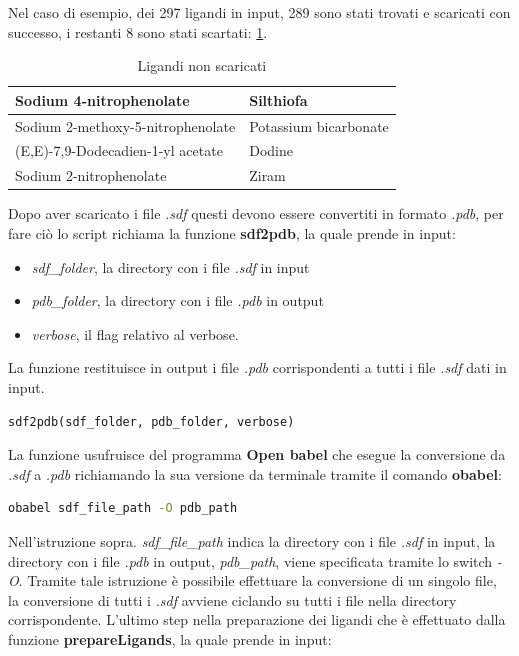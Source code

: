 Nel caso di esempio, dei 297 ligandi in input, 289 sono stati trovati e scaricati con successo, i restanti 8 sono stati scartati: \ref{tab:Ligandi scartati}.

\begin{table}[H]
    \centering
    \begin{tabular}{|l|l|}
    \hline
    Sodium 4-nitrophenolate & Silthiofa \\ \hline
    Sodium 2-methoxy-5-nitrophenolate & Potassium bicarbonate \\ \hline
    (E,E)-7,9-Dodecadien-1-yl acetate & Dodine \\ \hline
    Sodium 2-nitrophenolate & Ziram \\ \hline
    \end{tabular}
    \caption{Ligandi non scaricati}
    \label{tab:Ligandi scartati}
\end{table}

Dopo aver scaricato i file \textit{.sdf} questi devono essere convertiti in formato \textit{.pdb}, per fare ciò lo script richiama la funzione \textbf{sdf2pdb}, la quale prende in input:

\begin{itemize}
    \item \textit{sdf\_folder}, la directory con i file \textit{.sdf} in input
    \item \textit{pdb\_folder}, la directory con i file \textit{.pdb} in output
    \item \textit{verbose}, il flag relativo al verbose.
\end{itemize}

La funzione restituisce in output i file \textit{.pdb} corrispondenti a tutti i file \textit{.sdf} dati in input.

\begin{lstlisting}[language=Python, label=lst:code7, caption={funzione sdf2pdb}]
sdf2pdb(sdf_folder, pdb_folder, verbose)
\end{lstlisting}

La funzione usufruisce del programma \textbf{Open babel} che esegue la conversione da \textit{.sdf} a \textit{.pdb} richiamando la sua versione da terminale tramite il comando \textbf{obabel}:

\begin{lstlisting}[language=Bash, label=lst:code8, caption={Comando per la conversione da .sdf a .pdb}]
obabel sdf_file_path -O pdb_path
\end{lstlisting}

Nell'istruzione sopra. \textit{sdf\_file\_path} indica la directory con i file \textit{.sdf} in input, la directory con i file \textit{.pdb} in output, \textit{pdb\_path}, viene specificata tramite lo switch \textit{-O}. Tramite tale istruzione è possibile effettuare la conversione di un singolo file, la conversione di tutti i \textit{.sdf} avviene ciclando su tutti i file nella directory corrispondente.\newline
L'ultimo step nella preparazione dei ligandi che è effettuato dalla funzione \textbf{prepareLigands}, la quale prende in input:

